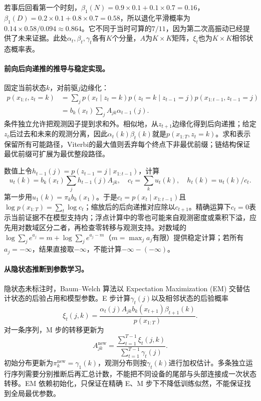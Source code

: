 若事后回看第一个时刻，$\beta_1(N)=0.9\times0.1+0.1\times0.7=0.16$，$\beta_1(D)=0.2\times0.1+0.8\times0.7=0.58$，所以退化平滑概率为$0.14\times0.58/0.094\approx0.864$。它不同于当时可算的$7/11$，因为第二次高振动已经提供了未来证据。此处$\alpha_t,\beta_t,\gamma_t$各有$K$个分量，$A$为$K\times K$矩阵，$\xi_t$也为$K\times K$相邻状态概率表。

\paragraph{前向后向递推的推导与稳定实现。}
固定当前状态$k$，对前驱$j$边缘化：
\begin{align}
 p(x_{1:t},z_t=k)
 &=\sum_jp(x_t\mid z_t=k)p(z_t=k\mid z_{t-1}=j)
             p(x_{1:t-1},z_{t-1}=j)\\
 &=b_k(x_t)\sum_jA_{jk}\alpha_{t-1}(j).
\end{align}
条件独立允许把观测因子提到求和外。相似地，从$z_{t+1}$边缘化得到后向递推；给定$z_t$后过去和未来的观测分离，因此$\alpha_t(k)\beta_t(k)$就是$p(x_{1:T},z_t=k)$。求和表示保留所有可能路径，Viterbi的最大值则丢弃每个终点下非最优前缀；链结构保证最优前缀可扩展为最优整段路径。

数值上令$h_{t-1}(j)=p(z_{t-1}=j\mid x_{1:t-1})$，计算
\begin{equation}
 u_t(k)=b_k(x_t)\sum_jh_{t-1}(j)A_{jk},\quad
 c_t=\sum_ku_t(k),\quad h_t(k)=u_t(k)/c_t.
\end{equation}
第一步用$u_1(k)=\pi_kb_k(x_1)$。于是$c_t=p(x_t\mid x_{1:t-1})$且$\log p(x_{1:T})=\sum_t\log c_t$；缩放后的后向递推对应除以$c_{t+1}$。精确运算下$c_t=0$表示当前证据不在模型支持内；浮点计算中的零也可能来自观测密度或乘积下溢，应先用对数域区分二者，再检查零转移与观测支持。对数域的$\log\sum_j e^{a_j}=m+\log\sum_je^{a_j-m}$（$m=\max_ja_j$有限）提供稳定计算；若所有$a_j=-\infty$，结果直接取$-\infty$，不能计算$-\infty-(-\infty)$。

\paragraph{从隐状态推断到参数学习。}
隐状态未标注时，Baum--Welch 算法以 Expectation Maximization (EM) 交替估计状态的后验占用和模型参数。E 步计算$\gamma_t(j)$以及相邻状态的后验概率
\begin{equation}
 \xi_t(j,k)=\frac{\alpha_t(j)A_{jk}b_k(x_{t+1})\beta_{t+1}(k)}{p(x_{1:T})}.
\end{equation}
对一条序列，M 步的转移更新为
\begin{equation}
 A_{jk}^{\mathrm{new}}=
 \frac{\sum_{t=1}^{T-1}\xi_t(j,k)}{\sum_{t=1}^{T-1}\gamma_t(j)}.
\end{equation}
初始分布更新为$\pi_k^{\mathrm{new}}=\gamma_1(k)$，观测分布则按$\gamma_t(k)$进行加权估计。多条独立运行序列需要分别推断后再汇总计数，不能把不同设备的尾部与头部连接成一次状态转移。EM 依赖初始化，只保证在精确 E、M 步下不降低训练似然，不能保证找到全局最优参数。

